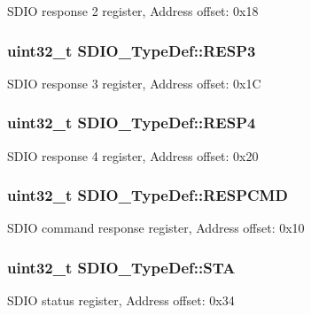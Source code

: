 S\-D\-I\-O response 2 register, Address offset\-: 0x18 \hypertarget{struct_s_d_i_o___type_def_a70f3e911570bd326bff852664fd8a7d5}{
\subsubsection[{R\-E\-S\-P3}]{ uint32\-\_\-t S\-D\-I\-O\-\_\-\-Type\-Def\-::\-R\-E\-S\-P3}}\label{struct_s_d_i_o___type_def_a70f3e911570bd326bff852664fd8a7d5}
S\-D\-I\-O response 3 register, Address offset\-: 0x1\-C \hypertarget{struct_s_d_i_o___type_def_ac7b45c7672922d38ffb0a1415a122716}{
\subsubsection[{R\-E\-S\-P4}]{ uint32\-\_\-t S\-D\-I\-O\-\_\-\-Type\-Def\-::\-R\-E\-S\-P4}}\label{struct_s_d_i_o___type_def_ac7b45c7672922d38ffb0a1415a122716}
S\-D\-I\-O response 4 register, Address offset\-: 0x20 \hypertarget{struct_s_d_i_o___type_def_a9d881ed6c2fdecf77e872bcc6b404774}{
\subsubsection[{R\-E\-S\-P\-C\-M\-D}]{ uint32\-\_\-t S\-D\-I\-O\-\_\-\-Type\-Def\-::\-R\-E\-S\-P\-C\-M\-D}}\label{struct_s_d_i_o___type_def_a9d881ed6c2fdecf77e872bcc6b404774}
S\-D\-I\-O command response register, Address offset\-: 0x10 \hypertarget{struct_s_d_i_o___type_def_a6b917b09c127e77bd3128bbe19a00499}{
\subsubsection[{S\-T\-A}]{ uint32\-\_\-t S\-D\-I\-O\-\_\-\-Type\-Def\-::\-S\-T\-A}}\label{struct_s_d_i_o___type_def_a6b917b09c127e77bd3128bbe19a00499}
S\-D\-I\-O status register, Address offset\-: 0x34 

